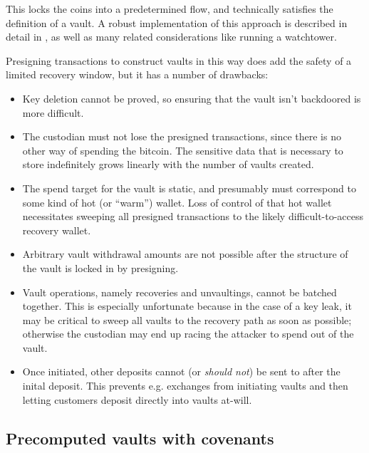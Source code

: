 \documentclass[10pt]{article}
\begin{document}
This locks the coins into a predetermined flow, and technically satisfies the
definition of a vault. A robust implementation of this approach is described in detail
in \cite{Swambo}, as well as many related considerations like running a watchtower.

Presigning transactions to construct vaults in this way does add the safety of a
limited recovery window, but it has a number of drawbacks:

\begin{itemize}

  \item Key deletion cannot be proved, so ensuring that the vault isn't
    backdoored is more difficult.

  \item The custodian must not lose the presigned transactions, since there is no other
    way of spending the bitcoin. The sensitive data that is necessary to store
    indefinitely grows linearly with the number of vaults created.

  \item The spend target for the vault is static, and presumably must correspond to
    some kind of hot (or ``warm'') wallet. Loss of control of that hot wallet
    necessitates sweeping all presigned transactions to the likely difficult-to-access
    recovery wallet.

  \item Arbitrary vault withdrawal amounts are not possible after the structure of the
    vault is locked in by presigning.

  \item Vault operations, namely recoveries and unvaultings, cannot be batched together. This is
    especially unfortunate because in the case of a key leak, it may be
    critical to sweep all vaults to the recovery path as soon as possible; otherwise the
    custodian may end up racing the attacker to spend out of the vault.

  \item Once initiated, other deposits cannot (or \emph{should not}) be sent to after the
    inital deposit. This prevents e.g. exchanges from initiating vaults and then
    letting customers deposit directly into vaults at-will.

\end{itemize}


\subsection*{Precomputed vaults with covenants}
\end{document}
